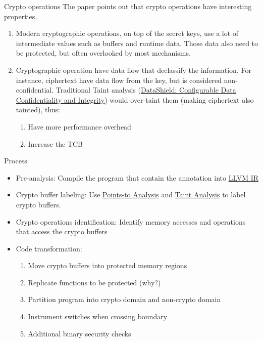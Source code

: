 \documentclass[presentation]{beamer}
\begin{document}
\begin{frame}[label={sec:orgfd71d83}]{Crypto operations}
The paper points out that crypto operations have interesting properties.
\begin{enumerate}
\item Modern cryptographic operations, on top of the secret keys, use a lot of \alert{intermediate values} such as buffers and runtime data. Those data also need to be protected, but often overlooked by most mechanisms.
\item Cryptographic operation have data flow that declassify the information. For instance, ciphertext have data flow from the key, but is considered non-confidential. Traditional Taint analysis (\href{20211116123706-datashield_configurable_data_confidentiality_and_integrity.org}{DataShield: Configurable Data Confidentiality and Integrity}) would over-taint them (making ciphertext also tainted), thus:
\begin{enumerate}
\item Have more performance overhead
\item Increase the TCB
\end{enumerate}
\end{enumerate}
\end{frame}

\begin{frame}[label={sec:orge0c88dd}]{Process}
\begin{itemize}
\item \alert{Pre-analysis}: Compile the program that contain the annotation into \href{20211116153642-llvm_ir.org}{LLVM IR}
\item \alert{Crypto buffer labeling}: Use \href{20211116154224-points_to_analysis.org}{Points-to Analysis} and \href{20211116143831-taint_analysis.org}{Taint Analysis} to label crypto buffers.
\item \alert{Crypto operations identification}: Identify memory accesses and operations that access the crypto buffers
\item \alert{Code transformation}:
\begin{enumerate}
\item Move crypto buffers into protected memory regions
\item Replicate functions to be protected (why?)
\item Partition program into crypto domain and non-crypto domain
\item Instrument switches when crossing boundary
\item Additional binary security checks
\end{enumerate}
\end{itemize}
\end{frame}
\end{document}
